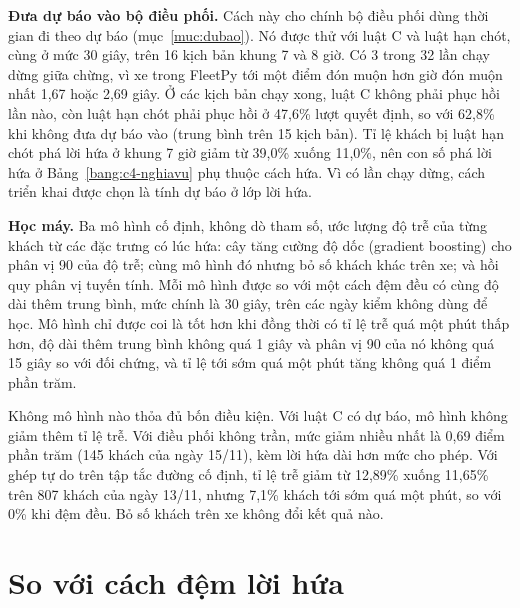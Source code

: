 \textbf{Đưa dự báo vào bộ điều phối.} Cách này cho chính bộ điều phối dùng thời gian đi theo dự báo
(mục~\ref{muc:dubao}). Nó được thử với luật C và luật hạn chót, cùng ở mức 30 giây, trên 16 kịch bản khung 7 và 8
giờ. Có 3 trong 32 lần chạy dừng giữa chừng, vì xe trong FleetPy tới một điểm đón muộn hơn giờ đón muộn nhất 1,67
hoặc 2,69 giây. Ở các kịch bản chạy xong, luật C không phải phục hồi lần nào, còn luật hạn chót phải phục hồi ở
47,6\% lượt quyết định, so với 62,8\% khi không đưa dự báo vào (trung bình trên 15 kịch bản). Tỉ lệ khách bị luật
hạn chót phá lời hứa ở khung 7 giờ giảm từ 39,0\% xuống 11,0\%, nên con số phá lời hứa ở Bảng~\ref{bang:c4-nghiavu}
phụ thuộc cách hứa. Vì có lần chạy dừng, cách triển khai được chọn là tính dự báo ở lớp lời hứa.

\textbf{Học máy.} Ba mô hình cố định, không dò tham số, ước lượng độ trễ của từng khách từ các đặc trưng có lúc
hứa: cây tăng cường độ dốc (gradient boosting) cho phân vị 90 của độ trễ; cùng mô hình đó nhưng bỏ số khách khác
trên xe; và hồi quy phân vị tuyến tính. Mỗi mô hình được so với một cách đệm đều có cùng độ dài thêm trung bình,
mức chính là 30 giây, trên các ngày kiểm không dùng để học. Mô hình chỉ được coi là tốt hơn khi đồng thời có tỉ lệ
trễ quá một phút thấp hơn, độ dài thêm trung bình không quá 1 giây và phân vị 90 của nó không quá 15 giây so với đối
chứng, và tỉ lệ tới sớm quá một phút tăng không quá 1 điểm phần trăm.

Không mô hình nào thỏa đủ bốn điều kiện. Với luật C có dự báo, mô hình không giảm thêm tỉ lệ trễ. Với điều phối
không trần, mức giảm nhiều nhất là 0,69 điểm phần trăm (145 khách của ngày 15/11), kèm lời hứa dài hơn mức cho phép.
Với ghép tự do trên tập tắc đường cố định, tỉ lệ trễ giảm từ 12,89\% xuống 11,65\% trên 807 khách của ngày 13/11,
nhưng 7,1\% khách tới sớm quá một phút, so với 0\% khi đệm đều. Bỏ số khách trên xe không đổi kết quả nào.

\section{So với cách đệm lời hứa}
\label{muc:c4-dem}

